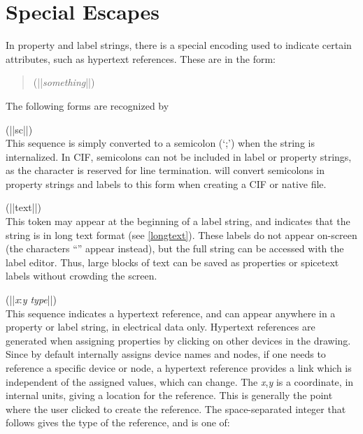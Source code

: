 \section{Special Escapes}
\label{prpescapes}

In property and label strings, there is a special encoding used to
indicate certain attributes, such as hypertext references.  These are
in the form:
\begin{quote}
{\vt (||}{\it something\/}{\vt ||)}
\end{quote}

The following forms are recognized by {\Xic}
\begin{description}
\item{\vt (||sc||)}\\
This sequence is simply converted to a semicolon (`{\vt ;}')
when the string is internalized.  In CIF, semicolons can not be
included in label or property strings, as the character is
reserved for line termination.  {\Xic} will convert
semicolons in property strings and labels to this form when
creating a CIF or native file.

\item{\vt (||text||)}\\
This token may appear at the beginning of a label string, and
indicates that the string is in long text format (see \ref{longtext}). 
These labels do not appear on-screen (the characters ``{\vt [text]}''
appear instead), but the full string can be accessed with the label
editor.  Thus, large blocks of text can be saved as properties or {\vt
spicetext} labels without crowding the screen.

\item{\vt (||}{\it x\/}:{\it y type\/}{\vt ||)}\\
This sequence indicates a hypertext reference, and can appear anywhere
in a property or label string, in electrical data only.  Hypertext
references are generated when assigning properties by clicking on
other devices in the drawing.  Since {\Xic} by default internally
assigns device names and nodes, if one needs to reference a specific
device or node, a hypertext reference provides a link which is
independent of the assigned values, which can change.  The {\it
x},{\it y} is a coordinate, in internal units, giving a location for
the reference.  This is generally the point where the user clicked to
create the reference.  The space-separated integer that follows gives
the type of the reference, and is one of:


\end{description}
